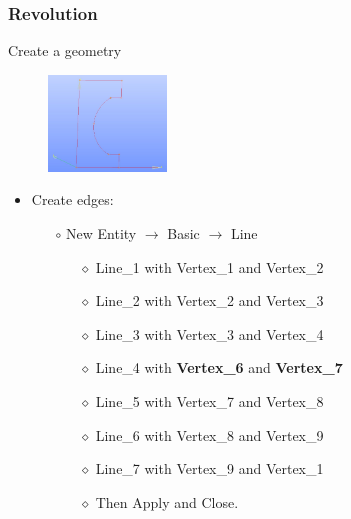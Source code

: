 \documentclass[10pt]{beamer}
\begin{document}
\begin{frame}
\frametitle{Revolution}
\begin{block}{Create a geometry}

\begin{figure}
\includegraphics[width=0.28\textwidth]{PICTURES/salome7.jpg}
\end{figure}

\begin{itemize}

\item Create edges:
    \begin{itemize}
    \item [$\circ$] New Entity $\rightarrow$ Basic $\rightarrow$ Line
        \begin{itemize}
        \item [$\diamond$] Line\_1 with Vertex\_1 and Vertex\_2
        \item [$\diamond$] Line\_2 with Vertex\_2 and Vertex\_3
        \item [$\diamond$] Line\_3 with Vertex\_3 and Vertex\_4
        \item [$\diamond$] Line\_4 with \textbf{Vertex\_6} and \textbf{Vertex\_7}
        \item [$\diamond$] Line\_5 with Vertex\_7 and Vertex\_8
        \item [$\diamond$] Line\_6 with Vertex\_8 and Vertex\_9
        \item [$\diamond$] Line\_7 with Vertex\_9 and Vertex\_1
        \item [$\diamond$] Then Apply and Close.
        \end{itemize}
    \end{itemize}
\end{itemize}

\end{block}
\end{frame}
\end{document}
